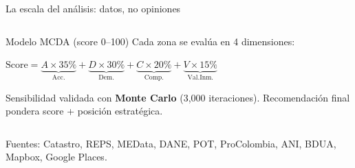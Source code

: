 \documentclass[aspectratio=169, 11pt]{beamer}
\begin{document}
\begin{frame}{La escala del análisis: datos, no opiniones}
\begin{columns}[T]
\begin{exampleblock}{\small Modelo MCDA (score 0--100)}
\scriptsize
Cada zona se evalúa en 4 dimensiones:

\vspace{3pt}
$\text{Score} = \underbrace{A \times 35\%}_{\text{Acc.}} + \underbrace{D \times 30\%}_{\text{Dem.}} + \underbrace{C \times 20\%}_{\text{Comp.}} + \underbrace{V \times 15\%}_{\text{Val.Inm.}}$

\vspace{4pt}
Sensibilidad validada con \textbf{Monte Carlo} (3,000 iteraciones). Recomendación final pondera score + posición estratégica.
\end{exampleblock}
\end{columns}

\vspace{2pt}
{\scriptsize\color{slate} Fuentes: Catastro, REPS, MEData, DANE, POT, ProColombia, ANI, BDUA, Mapbox, Google Places.}
\end{frame}
\end{document}

